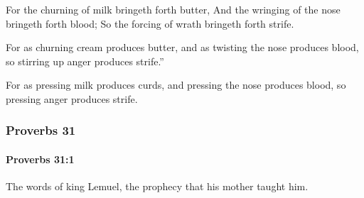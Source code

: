 			\begin{versebox}
					\item[BHS] 
					\item[ASV] For the churning of milk bringeth forth butter, And the wringing of the nose bringeth forth blood; So the forcing of wrath bringeth forth strife.
					\item[NIV] For as churning cream produces butter, and as twisting the nose produces blood, so stirring up anger produces strife.”
					\item[NRSV] For as pressing milk produces curds, and pressing the nose produces blood, so pressing anger produces strife.
			\end{versebox}
	\subsubsection{Proverbs 31} %
		\label{PROVERBS-31}

		\paragraph{Proverbs 31:1} %
			\label{PROVERBS-31-1}

			The words of king Lemuel, the prophecy that his mother taught him.

